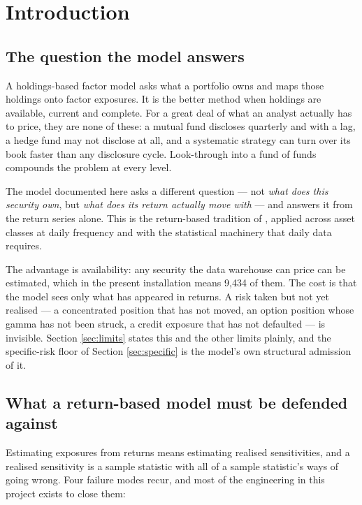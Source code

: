 \documentclass[11pt,a4paper]{article}
\begin{document}
\section{Introduction}

\subsection{The question the model answers}

A holdings-based factor model asks what a portfolio owns and maps those holdings onto
factor exposures. It is the better method when holdings are available, current and
complete. For a great deal of what an analyst actually has to price, they are none of
these: a mutual fund discloses quarterly and with a lag, a hedge fund may not
disclose at all, and a systematic strategy can turn over its book faster than any
disclosure cycle. Look-through into a fund of funds compounds the problem at every
level.

The model documented here asks a different question --- not \emph{what does this
security own}, but \emph{what does its return actually move with} --- and answers it
from the return series alone. This is the return-based tradition of
\citet{sharpe1992}, applied across asset classes at daily frequency and with the
statistical machinery that daily data requires.

The advantage is availability: any security the data warehouse can price can be
estimated, which in the present installation means 9{,}434 of them. The cost is that
the model sees only what has appeared in returns. A risk taken but not yet realised
--- a concentrated position that has not moved, an option position whose gamma has
not been struck, a credit exposure that has not defaulted --- is invisible. Section
\ref{sec:limits} states this and the other limits plainly, and the specific-risk
floor of Section \ref{sec:specific} is the model's own structural admission of it.

\subsection{What a return-based model must be defended against}

Estimating exposures from returns means estimating realised sensitivities, and a
realised sensitivity is a sample statistic with all of a sample statistic's ways of
going wrong. Four failure modes recur, and most of the engineering in this project
exists to close them:
\end{document}
